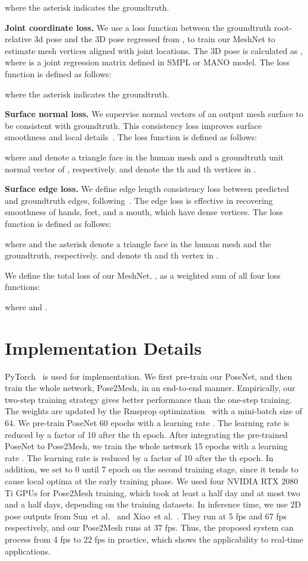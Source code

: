 \documentclass[runningheads]{llncs}
\begin{document}
where the asterisk indicates the groundtruth.

\noindent\textbf{Joint coordinate loss.}
We use a  loss function between the groundtruth root-relative 3d pose and the 3D pose regressed from , to train our MeshNet to estimate mesh vertices aligned with joint locations.
The 3D pose is calculated as , where  is a joint regression matrix defined in SMPL or MANO model. 
The loss function is defined as follows:

where the asterisk indicates the groundtruth.

\noindent\textbf{Surface normal loss.}
We supervise normal vectors of an output mesh surface to be consistent with groundtruth.
This consistency loss improves surface smoothness and local details~\cite{wang2018pix2mesh}.
The loss function  is defined as follows:

where  and  denote a triangle face in the human mesh and a groundtruth unit normal vector of , respectively.  and  denote the th and th vertices in .

\noindent\textbf{Surface edge loss.}
We define edge length consistency loss between predicted and groundtruth edges, following~\cite{wang2018pix2mesh}.
The edge loss is effective in recovering smoothness of hands, feet, and a mouth, which have dense vertices.
The loss function  is defined as follows:

where  and the asterisk denote a triangle face in the human mesh and the groundtruth, respectively.
 and  denote th and th vertex in .


We define the total loss of our MeshNet, , as a weighted sum of all four loss functions:

where  and .
 \vspace{-1mm}
\section{Implementation Details}
\vspace{-1mm}
PyTorch~\cite{paszke2017automatic} is used for implementation. 
We first pre-train our PoseNet, and then train the whole network, Pose2Mesh, in an end-to-end manner.
Empirically, our two-step training strategy gives better performance than the one-step training.
The weights are updated by the Rmsprop optimization~\cite{hinton2012rmsprop} with a mini-batch size of 64.
We pre-train PoseNet 60 epochs with a learning rate .
The learning rate is reduced by a factor of 10 after the th epoch.
After integrating the pre-trained PoseNet to Pose2Mesh, we train the whole network 15 epochs with a learning rate .  
The learning rate is reduced by a factor of 10 after the th epoch.
In addition, we set  to 0 until 7 epoch on the second training stage, since it tends to cause local optima at the early training phase.
We used four NVIDIA RTX 2080 Ti GPUs for Pose2Mesh training, which took at least a half day and at most two and a half days, depending on the training datasets.
In inference time, we use 2D pose outputs from Sun~et al.~\cite{sun2019deep} and Xiao~et al.~\cite{xiao2018simple}.
They run at 5 fps and 67 fps respectively, and our Pose2Mesh runs at 37 fps.
Thus, the proposed system can process from 4 fps to 22 fps in practice, which shows the applicability to real-time applications. 
 \vspace{-2mm}
\end{document}
